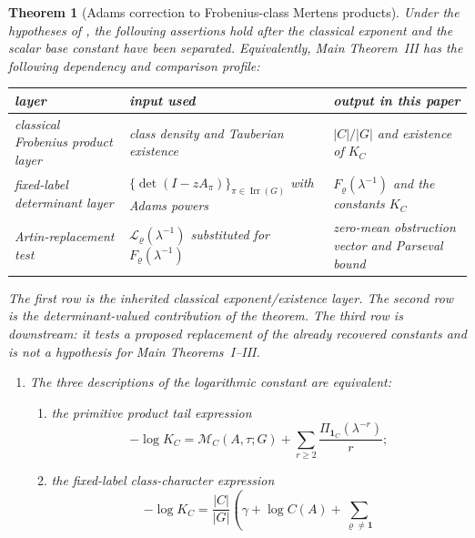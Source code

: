 \documentclass[11pt,a4paper]{amsart}
\theoremstyle{plain}
\newtheorem{theorem}{Theorem}[section]
\theoremstyle{definition}
\theoremstyle{remark}
\DeclareMathOperator{\Irr}{Irr}
\begin{document}
\begin{theorem}[Adams correction to Frobenius-class Mertens products]
  \label{thm:class-product-comparison}
  \label{prop:class-product-comparison}
  Under the hypotheses of , the
  following assertions hold after the classical exponent and the scalar base
  constant have been separated.
  Equivalently, Main Theorem~III has the following dependency and comparison
  profile:
  \begin{center}
  \small
  \begin{tabular}{>{\raggedright\arraybackslash}p{}
                  >{\raggedright\arraybackslash}p{}
                  >{\raggedright\arraybackslash}p{}}
    \toprule
    layer & input used & output in this paper\\
    \midrule
    classical Frobenius product layer
      & class density and Tauberian existence
      & \(|C|/|G|\) and existence of \(K_C\)\\
    fixed-label determinant layer
      & \(\{\det(I-zA_\pi)\}_{\pi\in\Irr(G)}\) with Adams powers
      & \(F_\varrho(\lambda^{-1})\) and the constants \(K_C\)\\
    Artin-replacement test
      & \(\mathcal L_\varrho(\lambda^{-1})\) substituted for
        \(F_\varrho(\lambda^{-1})\)
      & zero-mean obstruction vector and Parseval bound\\
    \bottomrule
  \end{tabular}
  \end{center}
  The first row is the inherited classical exponent/existence layer.  The
  second row is the determinant-valued contribution of the theorem.  The third
  row is downstream: it tests a proposed replacement of the already recovered
  constants and is not a hypothesis for Main Theorems~I--III.
  \begin{enumerate}[label=\textup{(\Alph*)}]
    \item The three descriptions of the logarithmic constant are equivalent:
  \begin{enumerate}[label=\textup{(\roman*)}]
    \item the primitive product tail expression
    \[
      -\log K_C=
      \mathcal M_C(A,\tau;G)
      +\sum_{r\ge2}\frac{\Pi_{\mathbf1_C}(\lambda^{-r})}{r};
    \]
    \item the fixed-label class-character expression
    \[
      -\log K_C=
      \frac{|C|}{|G|}
      \left(
        \gamma+\log C(A)
        +\sum_{\varrho\neq\mathbf1}
\]
\end{enumerate}
\end{enumerate}
\end{theorem}
\end{document}
